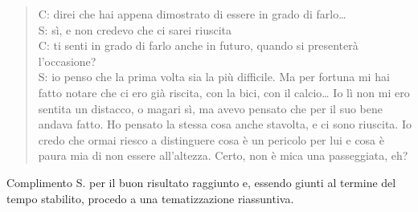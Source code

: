 \begin{verse}
C: direi che hai appena dimostrato di essere in grado di farlo\ldots\\
S: sì, e non credevo che ci sarei riuscita\\
C: ti senti in grado di farlo anche in futuro, quando si presenterà l'occasione?\\
S: io penso che la prima volta sia la più difficile. Ma per fortuna mi hai fatto notare che ci ero già riscita, con la bici, con il calcio\ldots{} Io lì non mi ero sentita un distacco, o magari sì, ma avevo pensato che per il suo bene andava fatto. Ho pensato la stessa cosa anche stavolta, e ci sono riuscita. Io credo che ormai riesco a distinguere cosa è un pericolo per lui e cosa è paura mia di non essere all'altezza. Certo, non è mica una passeggiata, eh?\\
\end{verse}

\noindent Complimento S. per il buon risultato raggiunto e, essendo giunti al termine del tempo stabilito, procedo a una tematizzazione riassuntiva.
